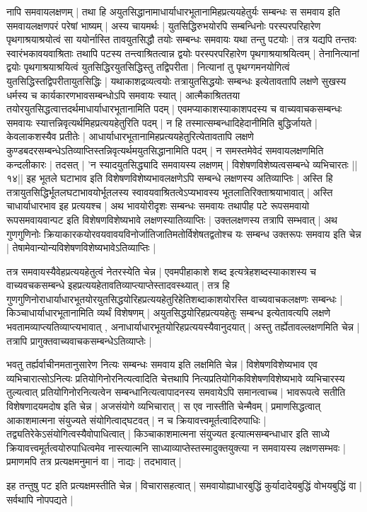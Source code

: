 नापि समवायलक्षणम् | तथा हि अयुतसिद्धानामाधार्याधारभूतानामिहप्रत्ययहेतुर्यः सम्बन्धः स समवाय इति समवायलक्षणपरं परेषां भाष्यम् | अस्य चायमर्थः | युतसिद्धिरुभयोरपि सम्बन्धिनोः परस्परपरिहारेण पृथगाश्रयाश्रयोत्वं सा ययोर्नास्ति तावयुतसिद्धौ तयोः सम्बन्धः समवायः यथा तन्तु पटयोः | तत्र यद्यपि तन्तवः स्वारंभकावयवाश्रिताः तथापि पटस्य तन्त्वाश्रितत्वान्न द्वयोः परस्परपरिहारेण पृथगाश्रयाश्रयित्वम् | तेनानित्यानां द्वयोः पृथगाश्रयाश्रयित्वं युतसिद्धिरयुतसिद्धिस्तु तद्विपरीता | नित्यानां तु पृथग्गमनयोगित्वं युतसिद्धिस्तद्विपरीतायुतसिद्धिः | यथाकाशद्रव्यत्वयोः तत्रायुतसिद्धयोः सम्बन्धः इत्येतावतापि लक्षणे सुखस्य धर्मस्य च कार्यकारणभावसम्बन्धोऽपि समवायः स्यात् | आत्मैकाश्रिततया तयोरयुतसिद्धत्वात्तदर्थमाधार्याधारभूतानामिति पदम् | एवमप्याकाशस्याकाशपदस्य च वाच्यवाचकसम्बन्धः समवायः स्यात्तन्निवृत्यर्थमिहप्रत्ययहेतुरिति पदम् | न हि तस्मात्सम्बन्धादिहेदानीमिति बुद्धिर्जायते | केवलाकशस्यैव प्रतीतेः | आधार्याधारभूतानामिहप्रत्ययहेतुरित्येतावतापि लक्षणे कुण्डबदरसम्बन्धेऽतिव्याप्तिस्तन्निवृत्यर्थमयुतसिद्धानामिति पदम् | न समस्तमेवेदं समवायलक्षणमिति कन्दलीकारः | तदसत् | 'न स्यादयुतसिद्ध्यादि समवायस्य लक्षणम् | विशेषणविशेष्यत्वसम्बन्धे व्यभिचारतः ||१४|| इह भूतले घटाभाव इति विशेषणविशेष्यभावलक्षणेऽपि सम्बन्धे लक्षणस्य अतिव्याप्तिः | अस्ति हि तत्रायुतसिद्धिर्भूतलघटाभावयोर्भूतलस्य स्वावयवाश्रितत्वेऽप्यभावस्य भूतलातिरिक्ताश्रयाभावात् | अस्ति चाधार्याधारभाव इह प्रत्ययश्च | अथ भावयोरीदृशः सम्बन्धः समवायः तथापीह पटे रूपसमवायो रूपसमवायवान्पट इति विशेषणविशेष्यभावे लक्षणस्यातिव्याप्तिः | उक्तलक्षणस्य तत्रापि सम्भवात् | अथ गुणगुणिनोः क्रियाकारकयोरवयवावयविनोर्जातिजातिमतोर्विशेषतद्वतोश्च यः सम्बन्ध उक्तरूपः समवाय इति चेन्न | तेषामेवान्योन्यविशेषणविशेष्यभावेऽतिव्याप्तिः |

तत्र समवायस्यैवेहप्रत्ययहेतुत्वं नेतरस्येति चेन्न | एवमपीहाकाशे शब्द इत्यत्रेहशब्दस्याकाशस्य च वाच्यवचकसम्बन्धे इहप्रत्ययहेतावतिव्याप्त्याप्तेस्तादवस्थ्यात् | तत्र हि गुणगुणिनोराधार्याधारभूतयोरयुतसिद्धयोरिहप्रत्ययहेतुरिहेतिशब्दाकाशयोरस्ति वाच्यवाचकलक्षणः सम्बन्धः | किञ्चाधार्याधारभूतानामिति व्यर्थं विशेषणम् | अयुतसिद्धयोरिहप्रत्ययहेतुः सम्बन्ध इत्येतावत्यपि लक्षणे भवतामव्याप्त्यतिव्याप्त्यभावात् , अनाधार्याधारभूतयोरिहप्रत्ययस्यैवानुदयात् | अस्तु तर्ह्येतावल्लक्षणमिति चेन्न | तत्रापि प्रागुक्तवाच्यवाचकसम्बन्धेऽतिव्याप्तेः | 

भवतु तर्ह्यर्वाचीनमतानुसारेण नित्यः सम्बन्धः समवाय इति लक्षमिति चेन्न | विशेषणविशेष्यभाव एव व्यभिचारात्सोऽनित्यः प्रतियोगिनोरनित्यत्वादिति चेत्तथापि नित्यप्रतियोगिकविशेषणविशेष्यभावे व्यभिचारस्य तुल्यत्वात् प्रतियोगिनोरनित्यत्वेन सम्बन्धानित्यत्वापादनस्य समवायेऽपि समानत्वाच्च | भावरूपत्वे सतीति विशेषणादयमदोष इति चेन्न | अजसंयोगे व्यभिचारात् | स एव नास्तीति चेन्मैवम् | प्रमाणसिद्धत्वात् आकाशमात्मना संयुज्यते संयोगित्वाद्घटवत् | न च क्रियावत्त्वमूर्तत्वादिरुपाधिः | तद्व्यतिरेकेऽसंयोगित्वस्यैवोपाधित्वात् | किञ्चाकाशमात्मना संयुज्यत इत्यात्मसम्बन्धाधार इति साध्ये क्रियावत्त्वमूर्तत्वयोरुपाधित्वमेव नास्त्यात्मनि साध्याव्याप्तेस्तस्मादुक्तयुक्त्या न समवायस्य लक्षणसम्भवः | प्रमाणमपि तत्र प्रत्यक्षमनुमानं वा | नाद्यः | तदभावात् |

इह तन्तुषु पट इति प्रत्यक्षमस्तीति चेन्न | विचारासहत्वात् | समवायोह्याधारबुद्धिं कुर्यादादेयबुद्धिं वोभयबुद्धिं वा |सर्वथापि नोपपद्यते |
